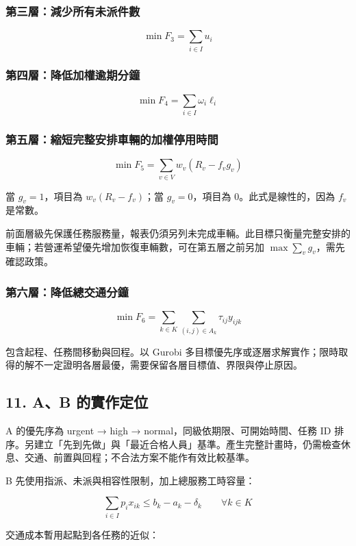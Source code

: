 \documentclass[UTF8,fontset=fandol]{ctexart}
\begin{document}
\subsubsection*{第三層：減少所有未派件數}

\[
\min F_3=\sum_{i\in I}u_i
\]

\subsubsection*{第四層：降低加權逾期分鐘}

\[
\min F_4=\sum_{i\in I}\omega_i\ell_i
\]

\subsubsection*{第五層：縮短完整安排車輛的加權停用時間}

\[
\min F_5=\sum_{v\in V}w_v\left(R_v-f_vg_v\right)
\]

當 $g_v=1$，項目為 $w_v(R_v-f_v)$；當 $g_v=0$，項目為 $0$。此式是線性的，因為 $f_v$ 是常數。

前面層級先保護任務服務量，報表仍須另列未完成車輛。此目標只衡量完整安排的車輛；若營運希望優先增加恢復車輛數，可在第五層之前另加 $\max\sum_v g_v$，需先確認政策。

\subsubsection*{第六層：降低總交通分鐘}

\[
\min F_6=\sum_{k\in K}\sum_{(i,j)\in A_k}\tau_{ij}y_{ijk}
\]

包含起程、任務間移動與回程。以 Gurobi 多目標優先序或逐層求解實作；限時取得的解不一定證明各層最優，需要保留各層目標值、界限與停止原因。

\subsection*{11. A、B 的實作定位}

A 的優先序為 urgent → high → normal，同級依期限、可開始時間、任務 ID 排序。另建立「先到先做」與「最近合格人員」基準。產生完整計畫時，仍需檢查休息、交通、前置與回程；不合法方案不能作有效比較基準。

B 先使用指派、未派與相容性限制，加上總服務工時容量：

\[
\sum_{i\in I}p_ix_{ik}\le b_k-a_k-\delta_k
\qquad\forall k\in K
\]

交通成本暫用起點到各任務的近似：
\end{document}
